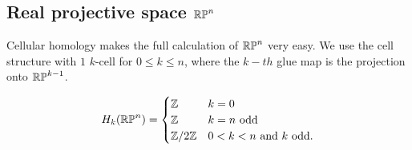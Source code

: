 \subsection{Real projective space $\mathbb{RP}^{n}$}
Cellular homology makes the full calculation of $\mathbb{RP}^{n}$ very easy. We use the cell structure with $1$ $k$-cell for $0\leq k\leq n$, where the $k-th$ glue map is the projection onto $\mathbb{RP}^{k-1}$.

\begin{proposition}
$$H_k(\mathbb{RP}^{n})=\begin{cases}\mathbb{Z} & k=0 \\
\mathbb{Z} &k=n \text{ odd}\\
\mathbb{Z}/2\mathbb{Z} & 0<k<n \text{ and } k \text{ odd.} \end{cases}$$
\end{proposition}

